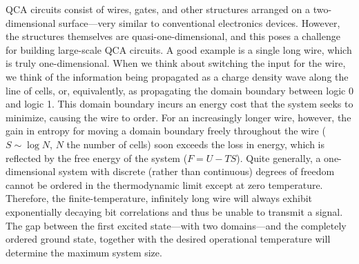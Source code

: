 QCA circuits consist of wires, gates, and other structures arranged on a
two-dimensional surface---very similar to conventional electronics devices.
However, the structures themselves are quasi-one-dimensional, and this poses a
challenge for building large-scale QCA circuits. A good example is a single long
wire, which is truly one-dimensional. When we think about switching the input
for the wire, we think of the information being propagated as a charge density
wave along the line of cells, or, equivalently, as propagating the domain
boundary between logic 0 and logic 1. This domain boundary incurs an energy cost
that the system seeks to minimize, causing the wire to order. For an
increasingly longer wire, however, the gain in entropy for moving a domain
boundary freely throughout the wire ($S \sim \log N$, $N$ the number of cells)
soon exceeds the loss in energy, which is reflected by the free energy of the
system ($F = U - T S$). Quite generally, a one-dimensional system with discrete
(rather than continuous) degrees of freedom cannot be ordered in the
thermodynamic limit except at zero temperature. Therefore, the
finite-temperature, infinitely long wire will always exhibit exponentially
decaying bit correlations and thus be unable to transmit a signal. The gap
between the first excited state---with two domains---and the completely ordered
ground state, together with the desired operational temperature will determine
the maximum system size.

